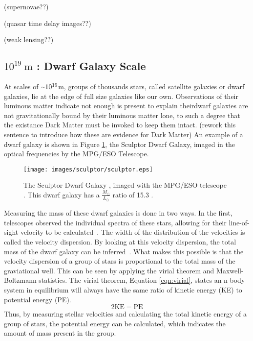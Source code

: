   {\color{red}(supernovae??)}

  {\color{red}(quasar time delay images??)}

  {\color{red}(weak lensing??)}
  
  \subsection{$10^{19}\:\text{m}$ : Dwarf Galaxy Scale}\label{dm_dwarfscale}
    At scales of $\nicetilde 10^{19}$m, groups of thousands stars, called satellite galaxies or dwarf galaxies, lie at the edge of full size galaxies like our own.
    {\color{red}Observations of their luminous matter indicate not enough is present to explain theirdwarf galaxies are not gravitationally bound by their luminous matter lone, to such a degree that the existance Dark Matter must be invoked to keep them intact. (rework this sentence to introduce how these are evidence for Dark Matter)}
    An example of a dwarf galaxy is shown in Figure \ref{fig:sculptor}, the Sculptor Dwarf Galaxy, imaged in the optical frequencies by the MPG/ESO Telescope.
    \begin{figure}[ht]
      \centering
      \texttt{[image: images/sculptor/sculptor.eps]}
      \caption[Sculptor Dwarf Galaxy]{
        The Sculptor Dwarf Galaxy \cite{sculptor_image}, imaged with the MPG/ESO telescope \cite{sculptor_paper}.
        This dwarf galaxy has a $\frac{M_\odot}{L_\odot}$ ratio of 15.3 \cite{sculptor_ml}.
      }
      \label{fig:sculptor}
    \end{figure}

    Measuring the mass of these dwarf galaxies is done in two ways.
    In the first, telescopes observed the individual spectra of these stars, allowing for their line-of-sight velocity to be calculated~\cite{dwarf_gal_red_giant}.
    The width of the distribution of the velocities is called the velocity dispersion.
    By looking at this velocity dispersion, the total mass of the dwarf galaxy can be inferred~\cite{dwarf_gal_vel_dispersion, dwarf_gal_vel_dispersion2}.
    What makes this possible is that the velocity dispersion of a group of stars is proportional to the total mass of the graviational well.
    This can be seen by applying the virial theorem and Maxwell-Boltzmann statistics.
    The virial theorem, Equation \ref{eqn:virial}, states an n-body system in equilibrium will always have the same ratio of kinetic energy (KE) to potential energy (PE).
    \begin{equation}\label{eqn:virial}
      2 \text{KE} = \text{PE}
    \end{equation}
    Thus, by measuring stellar velocities and calculating the total kinetic energy of a group of stars, the potential energy can be calculated, which indicates the amount of mass present in the group.

